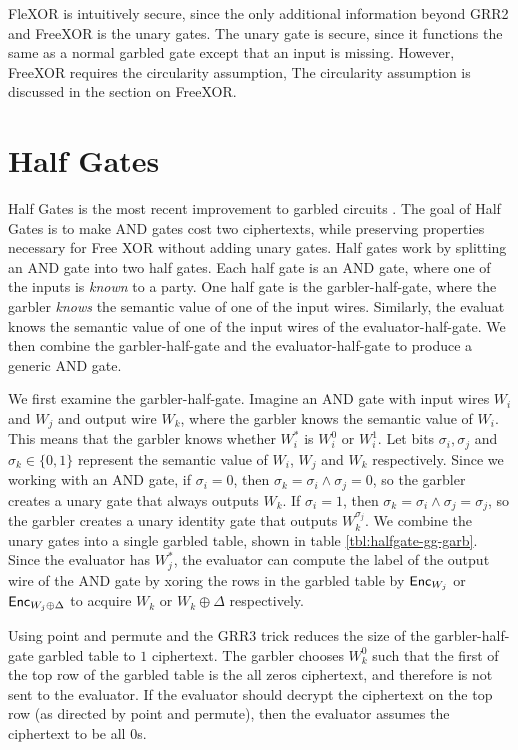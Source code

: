 FleXOR is intuitively secure, since the only additional information beyond GRR2 and FreeXOR is the unary gates.
The unary gate is secure, since it functions the same as a normal garbled gate except that an input is missing.
However, FreeXOR requires the circularity assumption, 
The circularity assumption is discussed in the section on FreeXOR.

\section{Half Gates}
Half Gates is the most recent improvement to garbled circuits \cite{twohalves}.
The goal of Half Gates is to make AND gates cost two ciphertexts, while preserving properties necessary for Free XOR without adding unary gates. 
Half gates work by splitting an AND gate into two half gates.
Each half gate is an AND gate, where one of the inputs is \textit{known} to a party.
One half gate is the garbler-half-gate, where the garbler \textit{knows} the semantic value of one of the input wires.
Similarly, the evaluat knows the semantic value of one of the input wires of the evaluator-half-gate.
We then combine the garbler-half-gate and the evaluator-half-gate to produce a generic AND gate.

We first examine the garbler-half-gate.
Imagine an AND gate with input wires $W_i$ and $W_j$ and output wire $W_k$, where the garbler knows the semantic value of $W_i$.
This means that the garbler knows whether $W_i^*$ is $W_i^0$ or $W_i^1$.
Let bits $\sigma_i, \sigma_j$ and $\sigma_k \in \{0,1\}$ represent the semantic value of $W_i$, $W_j$ and $W_k$ respectively.
Since we working with an AND gate, if $\sigma_i = 0$, then $\sigma_k = \sigma_i \wedge \sigma_j = 0$, so the garbler creates a unary gate that always outputs $W_k$.
If $\sigma_i = 1$, then $\sigma_k = \sigma_i \wedge \sigma_j = \sigma_j$, so the garbler creates a unary identity gate that outputs $W_k^{\sigma_j}$.
We combine the unary gates into a single garbled table, shown in table \ref{tbl:halfgate-gg-garb}.
Since the evaluator has $W_j^*$, the evaluator can compute the label of the output wire of the AND gate by xoring the rows in the garbled table by $\textsf{Enc}_{W_j}$ or $\textsf{Enc}_{W_j \oplus \Delta}$ to acquire $W_k$ or $W_k \oplus \Delta$ respectively. 

Using point and permute and the GRR3 trick reduces the size of the garbler-half-gate garbled table to $1$ ciphertext.
The garbler chooses $W_k^0$ such that the first of the top row of the garbled table is the all zeros ciphertext, and therefore is not sent to the evaluator.
If the evaluator should decrypt the ciphertext on the top row (as directed by point and permute), then the evaluator assumes the ciphertext to be all 0s.

